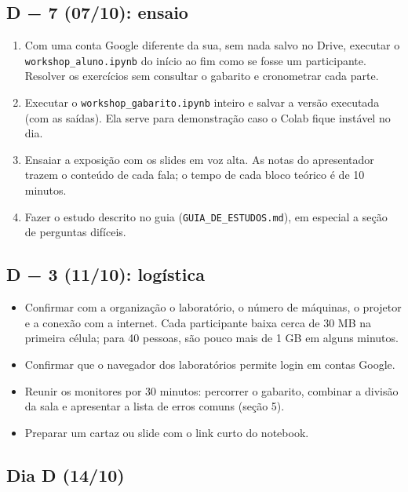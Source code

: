 \documentclass[
  11pt,
]{article}
\providecommand{\tightlist}{%
  \setlength{\itemsep}{0pt}\setlength{\parskip}{0pt}}
\begin{document}
\subsection{D − 7 (07/10): ensaio}\label{d-7-0710-ensaio}

\begin{enumerate}
\def\labelenumi{\arabic{enumi}.}
\tightlist
\item
  Com uma conta Google diferente da sua, sem nada salvo no Drive,
  executar o \texttt{workshop\_aluno.ipynb} do início ao fim como se
  fosse um participante. Resolver os exercícios sem consultar o gabarito
  e cronometrar cada parte.
\item
  Executar o \texttt{workshop\_gabarito.ipynb} inteiro e salvar a versão
  executada (com as saídas). Ela serve para demonstração caso o Colab
  fique instável no dia.
\item
  Ensaiar a exposição com os slides em voz alta. As notas do
  apresentador trazem o conteúdo de cada fala; o tempo de cada bloco
  teórico é de 10 minutos.
\item
  Fazer o estudo descrito no guia (\texttt{GUIA\_DE\_ESTUDOS.md}), em
  especial a seção de perguntas difíceis.
\end{enumerate}

\subsection{D − 3 (11/10): logística}\label{d-3-1110-loguxedstica}

\begin{itemize}
\tightlist
\item
  Confirmar com a organização o laboratório, o número de máquinas, o
  projetor e a conexão com a internet. Cada participante baixa cerca de
  30 MB na primeira célula; para 40 pessoas, são pouco mais de 1 GB em
  alguns minutos.
\item
  Confirmar que o navegador dos laboratórios permite login em contas
  Google.
\item
  Reunir os monitores por 30 minutos: percorrer o gabarito, combinar a
  divisão da sala e apresentar a lista de erros comuns (seção 5).
\item
  Preparar um cartaz ou slide com o link curto do notebook.
\end{itemize}

\subsection{Dia D (14/10)}\label{dia-d-1410}
\end{document}
